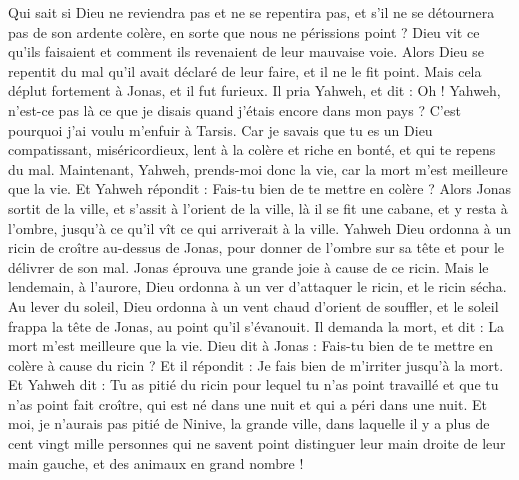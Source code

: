 \begin{multicols}{2}
Qui sait si Dieu ne reviendra pas et ne se repentira pas, et s'il ne se détournera pas de son ardente colère, en sorte que nous ne périssions point ?
Dieu vit ce qu’ils faisaient et comment ils revenaient de leur mauvaise voie. Alors Dieu se repentit du mal qu'il avait déclaré de leur faire, et il ne le fit point.
\VerseOne{}Mais cela déplut fortement à Jonas, et il fut furieux.
Il pria Yahweh, et dit : Oh ! Yahweh, n'est-ce pas là ce que je disais quand j'étais encore dans mon pays ? C'est pourquoi j'ai voulu m'enfuir à Tarsis. Car je savais que tu es un Dieu compatissant, miséricordieux, lent à la colère et riche en bonté, et qui te repens du mal.
Maintenant, Yahweh, prends-moi donc la vie, car la mort m'est meilleure que la vie.
Et Yahweh répondit : Fais-tu bien de te mettre en colère ?
Alors Jonas sortit de la ville, et s'assit à l'orient de la ville, là il se fit une cabane, et y resta à l'ombre, jusqu'à ce qu'il vît ce qui arriverait à la ville.
Yahweh Dieu ordonna à un ricin de croître au-dessus de Jonas, pour donner de l’ombre sur sa tête et pour le délivrer de son mal. Jonas éprouva une grande joie à cause de ce ricin.
Mais le lendemain, à l’aurore, Dieu ordonna à un ver d’attaquer le ricin, et le ricin sécha.
Au lever du soleil, Dieu ordonna à un vent chaud d’orient de souffler, et le soleil frappa la tête de Jonas, au point qu’il s’évanouit. Il demanda la mort, et dit : La mort m'est meilleure que la vie.
Dieu dit à Jonas : Fais-tu bien de te mettre en colère à cause du ricin ? Et il répondit : Je fais bien de m’irriter jusqu’à la mort.
Et Yahweh dit : Tu as pitié du ricin pour lequel tu n'as point travaillé et que tu n'as point fait croître, qui est né dans une nuit et qui a péri dans une nuit.
Et moi, je n’aurais pas pitié de Ninive, la grande ville, dans laquelle il y a plus de cent vingt mille personnes qui ne savent point distinguer leur main droite de leur main gauche, et des animaux en grand nombre !
\PPE{}
\end{multicols}
